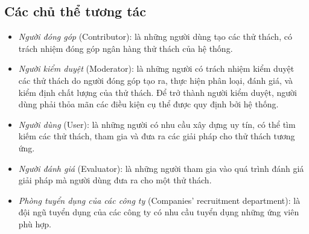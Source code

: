 \subsection{Các chủ thể tương tác}
\begin{itemize}
  \item \textit{Người đóng góp} (Contributor): là những người dùng tạo các thử thách, có trách nhiệm đóng góp ngân hàng thử thách của hệ thống.
  \item \textit{Người kiểm duyệt} (Moderator): là những người có trách nhiệm kiểm duyệt các thử thách do người đóng góp tạo ra, thực hiện phân loại, đánh giá, và kiểm định chất lượng của thử thách. Để trở thành người kiểm duyệt, người dùng phải thỏa mãn các điều kiện cụ thể được quy định bởi hệ thống.
  \item \textit{Người dùng} (User): là những người có nhu cầu xây dựng uy tín, có thể tìm kiếm các thử thách, tham gia và đưa ra các giải pháp cho thử thách tương ứng.
  \item \textit{Người đánh giá} (Evaluator): là những người tham gia vào quá trình đánh giá giải pháp mà người dùng đưa ra cho một thử thách.
  \item \textit{Phòng tuyển dụng của các công ty} (Companies' recruitment department): là đội ngũ tuyển dụng của các công ty có nhu cầu tuyển dụng những ứng viên phù hợp.
\end{itemize}

